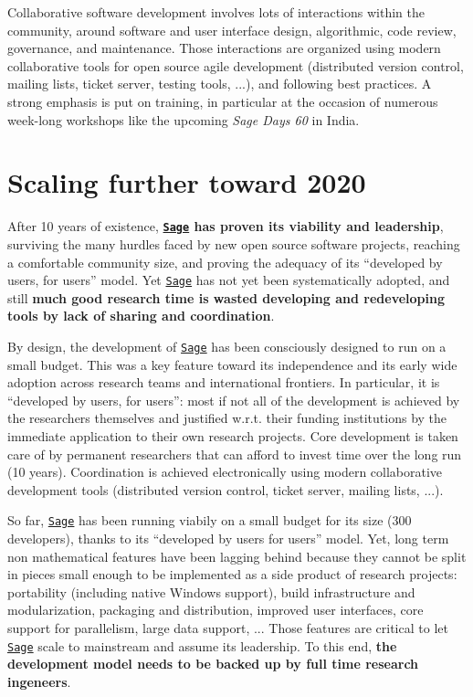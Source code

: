 \documentclass[a4,12pt]{amsart}
\newcommand{\sage}{\href{http://www.sagemath.org/}{\texttt{Sage}}\xspace}
\begin{document}
Collaborative software development involves lots of interactions
within the community, around software and user interface design,
algorithmic, code review, governance, and maintenance. Those
interactions are organized using modern collaborative tools for open
source agile development (distributed version control, mailing lists,
ticket server, testing tools, ...), and following best practices. A
strong emphasis is put on training, in particular at the occasion of
numerous week-long workshops like the upcoming \emph{Sage Days 60} in
India.

\section{Scaling further toward 2020}

After 10 years of existence, \textbf{\sage{} has proven its viability
  and leadership}, surviving the many hurdles faced by new open source
software projects, reaching a comfortable community size, and proving
the adequacy of its ``developed by users, for users'' model.  Yet
\sage{} has not yet been systematically adopted, and still \textbf{much
  good research time is wasted developing and redeveloping tools by
  lack of sharing and coordination}.

By design, the development of \sage{} has been consciously designed to
run on a small budget. This was a key feature toward its independence
and its early wide adoption across research teams and international
frontiers. In particular, it is ``developed by users, for users'':
most if not all of the development is achieved by the researchers
themselves and justified w.r.t. their funding institutions by the
immediate application to their own research projects. Core development
is taken care of by permanent researchers that can afford to invest
time over the long run (10 years). Coordination is achieved
electronically using modern collaborative development tools
(distributed version control, ticket server, mailing lists, ...).

So far, \sage{} has been running viabily on a small budget for its size
(300 developers), thanks to its ``developed by users for users''
model. Yet, long term non mathematical features have been lagging
behind because they cannot be split in pieces small enough to be
implemented as a side product of research projects: portability
(including native Windows support), build infrastructure and
modularization, packaging and distribution, improved user interfaces,
core support for parallelism, large data support, ... Those features
are critical to let \sage{} scale to mainstream and assume its
leadership. To this end, \textbf{the development model needs to be
  backed up by full time research ingeneers}.
\end{document}
